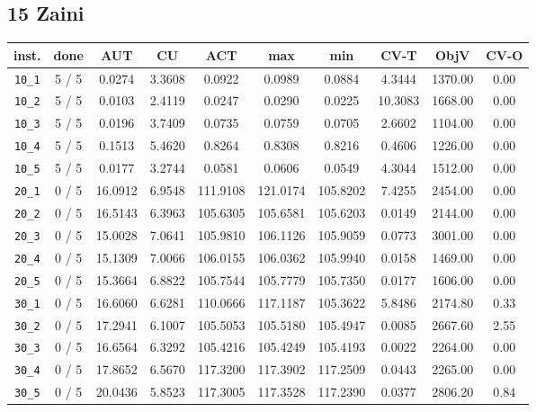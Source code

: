 \documentclass{scrartcl}
\begin{document}
\subsection{15 Zaini}

\begin{table}[h!]
\begin{center}
\small
\begin{tabular}{| c | c | c | c | c | c | c | c | c | c |}
\hline
inst. & done & AUT & CU & ACT & max & min & CV-T & ObjV & CV-O \\
\hline
\verb|10_1| & 5 / 5 & 0.0274 & 3.3608 & 0.0922 & 0.0989 & 0.0884 & 4.3444 & 1370.00 & 0.00\\ 
\verb|10_2| & 5 / 5 & 0.0103 & 2.4119 & 0.0247 & 0.0290 & 0.0225 & 10.3083 & 1668.00 & 0.00\\ 
\verb|10_3| & 5 / 5 & 0.0196 & 3.7409 & 0.0735 & 0.0759 & 0.0705 & 2.6602 & 1104.00 & 0.00\\ 
\verb|10_4| & 5 / 5 & 0.1513 & 5.4620 & 0.8264 & 0.8308 & 0.8216 & 0.4606 & 1226.00 & 0.00\\ 
\verb|10_5| & 5 / 5 & 0.0177 & 3.2744 & 0.0581 & 0.0606 & 0.0549 & 4.3044 & 1512.00 & 0.00\\ 
\verb|20_1| & 0 / 5 & 16.0912 & 6.9548 & 111.9108 & 121.0174 & 105.8202 & 7.4255 & 2454.00 & 0.00\\ 
\verb|20_2| & 0 / 5 & 16.5143 & 6.3963 & 105.6305 & 105.6581 & 105.6203 & 0.0149 & 2144.00 & 0.00\\ 
\verb|20_3| & 0 / 5 & 15.0028 & 7.0641 & 105.9810 & 106.1126 & 105.9059 & 0.0773 & 3001.00 & 0.00\\ 
\verb|20_4| & 0 / 5 & 15.1309 & 7.0066 & 106.0155 & 106.0362 & 105.9940 & 0.0158 & 1469.00 & 0.00\\ 
\verb|20_5| & 0 / 5 & 15.3664 & 6.8822 & 105.7544 & 105.7779 & 105.7350 & 0.0177 & 1606.00 & 0.00\\ 
\verb|30_1| & 0 / 5 & 16.6060 & 6.6281 & 110.0666 & 117.1187 & 105.3622 & 5.8486 & 2174.80 & 0.33\\ 
\verb|30_2| & 0 / 5 & 17.2941 & 6.1007 & 105.5053 & 105.5180 & 105.4947 & 0.0085 & 2667.60 & 2.55\\ 
\verb|30_3| & 0 / 5 & 16.6564 & 6.3292 & 105.4216 & 105.4249 & 105.4193 & 0.0022 & 2264.00 & 0.00\\ 
\verb|30_4| & 0 / 5 & 17.8652 & 6.5670 & 117.3200 & 117.3902 & 117.2509 & 0.0443 & 2265.00 & 0.00\\ 
\verb|30_5| & 0 / 5 & 20.0436 & 5.8523 & 117.3005 & 117.3528 & 117.2390 & 0.0377 & 2806.20 & 0.84\\ 

\end{tabular}
\end{center}
\end{table}
\end{document}
